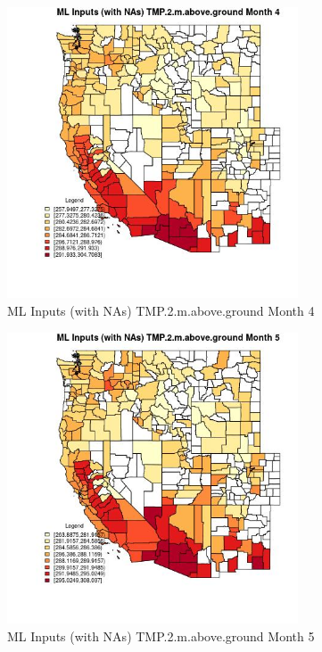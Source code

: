 \begin{figure} 
\centering  
\includegraphics[width=0.77\textwidth]{Code_Outputs/Report_ML_input_PM25_Step4_part_f_de_duplicated_aveswNAs_CountyTMP2mabovegroundmedianMonth4.jpg} 
\caption{\label{fig:Report_ML_input_PM25_Step4_part_f_de_duplicated_aveswNAsCountyTMP2mabovegroundmedianMonth4}ML Inputs (with NAs) TMP.2.m.above.ground Month 4} 
\end{figure} 
 

\clearpage 

\begin{figure} 
\centering  
\includegraphics[width=0.77\textwidth]{Code_Outputs/Report_ML_input_PM25_Step4_part_f_de_duplicated_aveswNAs_CountyTMP2mabovegroundmedianMonth5.jpg} 
\caption{\label{fig:Report_ML_input_PM25_Step4_part_f_de_duplicated_aveswNAsCountyTMP2mabovegroundmedianMonth5}ML Inputs (with NAs) TMP.2.m.above.ground Month 5} 
\end{figure} 
 

